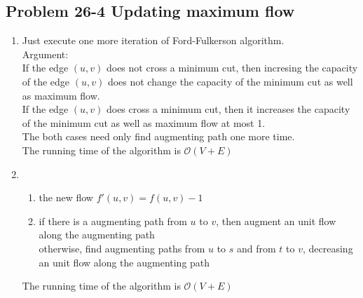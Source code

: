 \subsection*{Problem 26-4 Updating maximum flow}
\begin{enumerate}
	\item	Just execute one more iteration of Ford-Fulkerson algorithm.  \\
		Argument: \\
		If the edge $(u, v)$ does not cross a minimum cut, then incresing the capacity of the edge $(u, v)$ does not change the capacity of the minimum cut as well as maximum flow. \\
		If the edge $(u, v)$ does cross a minimum cut, then it increases the capacity of the minimum cut as well as maximum flow at most 1. \\
		The both cases need only find augmenting path one more time. \\
		
		The running time of the algorithm is $\mathcal{O}(V + E)$
	\item	\begin{enumerate}
			\item	the new flow $f'(u, v) = f(u, v) - 1$
			\item	if there is a augmenting path from $u$ to $v$, then augment an unit flow along the augmenting path \\
				otherwise, find augmenting paths from $u$ to $s$ and from $t$ to $v$, decreasing an unit flow along the augmenting path
		\end{enumerate}
		The running time of the algorithm is $\mathcal{O}(V + E)$
\end{enumerate}


